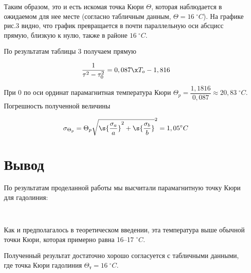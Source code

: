 \documentclass[12pt]{kiarticle}
\begin{document}
Таким образом, это и есть искомая точка Кюри $ \Theta $, которая наблюдается в ожидаемом для нее месте (согласно табличным данным, $ \Theta = 16 \; ^\circ C $). На графике рис.3 видно, что график превращается в почти параллельную оси абсцисс прямую, близкую к нулю, также в районе $ 16 \; ^\circ C $.

По результатам таблицы 3 получаем прямую 

\begin{equation}\label{}
 \dfrac{1}{ \tau^2 - \tau_0^2} = 0,087\x T_o - 1,816
\end{equation}

При 0 по оси ординат парамагнитная температура Кюри $ \Theta_p = \dfrac{1,1816}{0,087} \approx 20,83 \; ^\circ C$. Погрешность полученной величины

\begin{equation}\label{}
\sigma_{\Theta_p} = \Theta_p \sqrt{\s{\dfrac{\sigma_a}{a}}^2 + \s{\dfrac{\sigma_b}{b}}}^2 = 1,05 ^\circ C
\end{equation}

\section{Вывод}

По результатам проделанной работы мы высчитали парамагнитную точку Кюри для гадолиния:

\begin{center}
	{} \\
\end{center} 

Как и предполагалось в теоретическом введении, эта температура выше обычной точки Кюри, которая примерно равна 16--17 $ ^\circ C $. 

Полученный результат достаточно хорошо согласуется с табличными данными, где точка Кюри гадолиния $ \Theta_т = 16 \; ^\circ C $.
\end{document}

